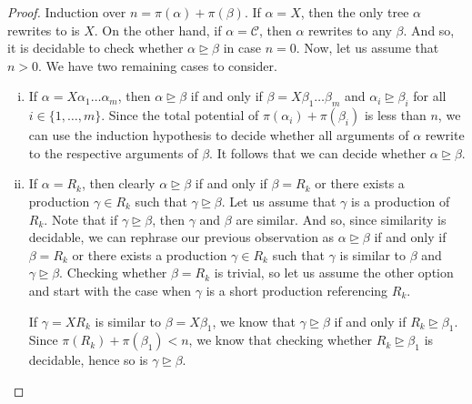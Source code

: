 \documentclass[11pt,a4paper]{amsart}
\theoremstyle{definition}
\newcommand{\potential}[1]{\pi(#1)}
\begin{document}
\begin{proof}
        Induction over $n = \potential{\alpha} + \potential{\beta}$.  If $\alpha
        = X$, then the only tree $\alpha$ rewrites to is $X$. On the other hand,
        if $\alpha = \mathcal{C}$, then $\alpha$ rewrites to any $\beta$. And so,
        it is decidable to check whether $\alpha \trianglerighteq \beta$ in case
        $n = 0$. Now, let us assume that $n > 0$. We have two remaining cases to
        consider.
        \begin{enumerate}[(i)]
            \item If $\alpha = X \alpha_1 \ldots \alpha_m$, then $\alpha
                    \trianglerighteq \beta$ if and only if $\beta = X \beta_1
                    \ldots \beta_m$ and $\alpha_i \trianglerighteq \beta_i$ for
                    all $i \in \{1,\ldots,m\}$. Since the total potential of
                    $\potential{\alpha_i} + \potential{\beta_i}$ is less than $n$, we can use
                    the induction hypothesis to decide whether all arguments of
                    $\alpha$ rewrite to the respective arguments of $\beta$. It
                    follows that we can decide whether $\alpha \trianglerighteq
                    \beta$.
           \item If $\alpha = R_k$, then clearly $\alpha \trianglerighteq \beta$
            if and only if $\beta = R_k$ or there exists a production $\gamma \in 
            	R_k$ such that
                   $\gamma \trianglerighteq \beta$. Let us assume that $\gamma$
                   is a production of $R_k$. Note that if $\gamma
                   \trianglerighteq \beta$, then $\gamma$ and $\beta$ are
                   similar. And so, since similarity is decidable, we can
                   rephrase our previous observation as $\alpha \trianglerighteq
                   \beta$ if and only if $\beta = R_k$ or there exists a production $\gamma \in
                   R_k$ such that $\gamma$ is similar to $\beta$ and $\gamma
                   \trianglerighteq \beta$. Checking whether $\beta = R_k$ is trivial, so let us assume the other option and start with the case when
                   $\gamma$ is a short production referencing $R_k$.

                   If $\gamma = X R_k$ is similar to $\beta = X \beta_1$, we
                   know that $\gamma \trianglerighteq \beta$ if and only if $R_k
                   \trianglerighteq \beta_1$. Since $\potential{R_k} +
                   \potential{\beta_1} < n$, we know that checking whether $R_k
                   \trianglerighteq \beta_1$ is decidable, hence so is 
                   $\gamma \trianglerighteq \beta$.
                   

\end{enumerate}
\end{proof}
\end{document}
